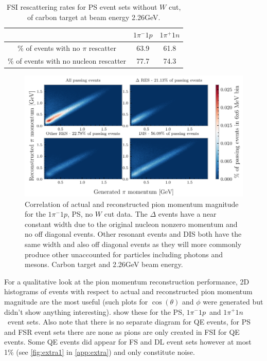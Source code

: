 \documentclass[a4paper,12pt]{article}
\newcommand{\md}{$1\pi^-1p$}
\newcommand{\pd}{$1\pi^+1n$}
\begin{document}
\begin{table}[H]
    \begin{center}
        \begin{tabular}{ c | c | c }
            & \md & \pd \\
            \hline
            \% of events with no $\pi$ rescatter & 63.9 & 61.8 \\  
            \hline
            \% of events with no nucleon rescatter & 77.7 & 74.3 \\
        \end{tabular}
    \end{center}
    \caption{FSI rescattering rates for PS event sets without $W$ cut, of carbon target at beam energy 2.26\si{GeV}.}\label{tab:FSI_re}
\end{table}

\begin{figure}[H]
    \centering
    \includegraphics{figures/python/vs_pp_C_m_ps.pdf}
    \caption{
        Correlation of actual and reconstructed pion momentum magnitude for the \md, PS, no $W$ cut data.
        The $\Delta$ events have a near constant width due to the original nucleon nonzero momentum and no off diagonal events.
        Other resonant events and DIS both have the same width and also off diagonal events as they will more commonly produce other unaccounted for particles including photons and mesons.
        Carbon target and 2.26\si{GeV} beam energy.
    }\label{fig:vs_pp_ps1}
\end{figure}

For a qualitative look at the pion momentum reconstruction performance, 2D histograms of events with respect to actual and reconstructed pion momentum magnitude are the most useful (such plots for $\cos(\theta)$ and $\phi$ were generated but didn't show anything interesting).
 show these for the PS, \md\ and \pd\ event sets.
Also note that there is no separate diagram for QE events, for PS and FSR event sets there are none as pions are only created in FSI for QE events.
Some QE events did appear for FS and DL event sets however at most 1\% (see \cref{fig:extra1} in \cref{app:extra}) and only constitute noise.
\end{document}
